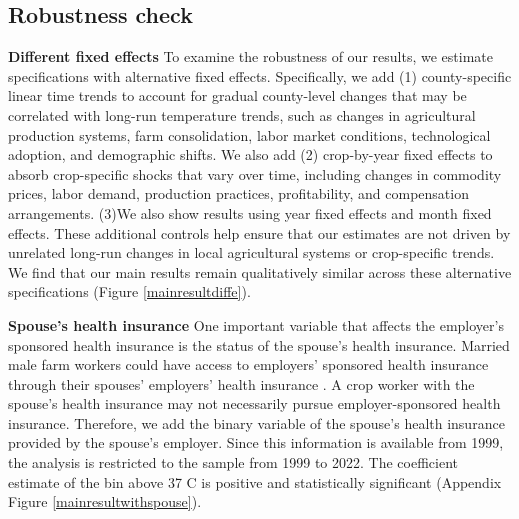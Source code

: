 \documentclass[12pt]{article}
\begin{document}
\subsection{Robustness check}
\noindent \textbf{Different fixed effects}
To examine the robustness of our results, we estimate specifications with alternative fixed effects. Specifically, we add (1) county-specific linear time trends to account for gradual county-level changes that may be correlated with long-run temperature trends, such as changes in agricultural production systems, farm consolidation, labor market conditions, technological adoption, and demographic shifts. We also add (2) crop-by-year fixed effects to absorb crop-specific shocks that vary over time, including changes in commodity prices, labor demand, production practices, profitability, and compensation arrangements. (3)We also show results using year fixed effects and month fixed effects. These additional controls help ensure that our estimates are not driven by unrelated long-run changes in local agricultural systems or crop-specific trends. We find that our main results remain qualitatively similar across these alternative specifications (Figure \ref{mainresultdiffe}).

\vspace{0.5cm}
\noindent \textbf{Spouse's health insurance}
One important variable that affects the employer's sponsored health insurance is the status of the spouse's health insurance. Married male farm workers could have access to employers' sponsored health insurance through their spouses' employers' health insurance \citep{kandilov_effect_2010}. A crop worker with the spouse's health insurance may not necessarily pursue employer-sponsored health insurance. Therefore, we add the binary variable of the spouse's health insurance provided by the spouse's employer. Since this information is available from 1999, the analysis is restricted to the sample from 1999 to 2022. The coefficient estimate of the bin above 37 \degree C is positive and statistically significant (Appendix Figure \ref{mainresultwithspouse}). 
\end{document}
